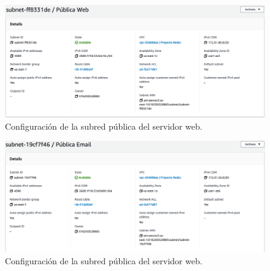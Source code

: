 \documentclass{article}
\begin{document}
\begin{figure}[H]
  \centering
  \includegraphics[width=\textwidth]{NAT/webSubnet}
  \caption{Configuraci\'on de la subred p\'ublica del
           servidor web.}
  \label{fig:NAT-webSubnet}
\end{figure}

\begin{figure}[H]
  \centering
  \includegraphics[width=\textwidth]{NAT/emailSubnet}
  \caption{Configuraci\'on de la subred p\'ublica del
           servidor web.}
  \label{fig:NAT-emailSubnet}
\end{figure}
\end{document}
